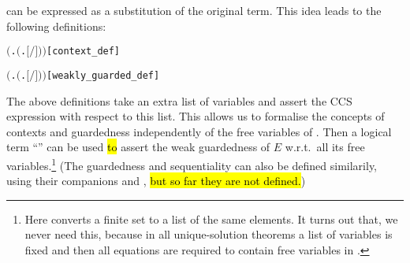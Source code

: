 can be expressed as a \univariate substitution of the original term.
This idea leads to the following definitions:
\begin{alltt}
      \HOLTokenDefEquality{}  \ensuremath{(}\HOLTokenLambda{}.  \ensuremath{(}\HOLTokenLambda{}. \ensuremath{[}\ensuremath{/}\ensuremath{]} \ensuremath{)}\ensuremath{)} \hfill{[context_def]}

      \HOLTokenDefEquality{}  \ensuremath{(}\HOLTokenLambda{}.  \ensuremath{(}\HOLTokenLambda{}. \ensuremath{[}\ensuremath{/}\ensuremath{]} \ensuremath{)}\ensuremath{)} \hfill{[weakly_guarded_def]}
\end{alltt}
The above definitions take an extra list of variables  and
assert the CCS expression  with respect to this list. This
allows us to formalise the concepts of contexts and guardedness
independently of the free variables of .
Then a logical term ``'' can
be used \hl{to} assert the weak guardedness of $E$ w.r.t.~all its free
variables.\footnote{Here  converts a finite set
  to a list of the same elements. It turns out that, we never need this, because
  in all unique-solution theorems a list of variables  is fixed and
  then all equations are required to contain free variables in
  .}
(The \multivariate guardedness and sequentiality can also be defined similarily, using
their \univariate companions  and , \hl{but so far
they are not defined.})

